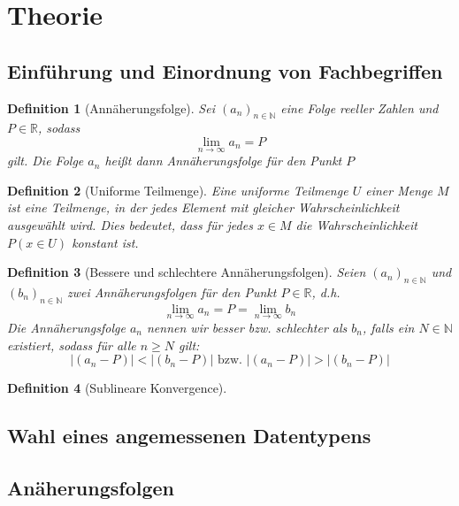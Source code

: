 \documentclass{scrartcl}
\newtheorem{definition}{Definition}
\newtheorem{approximation sequence}{Annäherungsfolge}
\begin{document}
\section{Theorie}

\subsection{Einführung und Einordnung von Fachbegriffen}

\begin{definition}[Annäherungsfolge]
  Sei \((a_n)_{n \in \mathbb{N}}\) eine Folge reeller Zahlen und \(P \in \mathbb{R}\), sodass
  \[\lim_{n \to \infty} a_n = P \] gilt.
  Die Folge \(a_n\) heißt dann Annäherungsfolge für den Punkt \(P\)

\end{definition}

\begin{definition}[Uniforme Teilmenge]
    Eine uniforme Teilmenge \(U\) einer Menge \(M\) ist eine Teilmenge, in der
    jedes Element mit gleicher Wahrscheinlichkeit ausgewählt wird.
    Dies bedeutet, dass für jedes \(x \in M\) die Wahrscheinlichkeit \(P(x \in U)\)
    konstant ist.
\end{definition}

\begin{definition}[Bessere und schlechtere Annäherungsfolgen]
  Seien \((a_n)_{n \in \mathbb{N}}\) und \((b_n)_{n \in \mathbb{N}}\) zwei Annäherungsfolgen für den Punkt \(P \in \mathbb{R}\), d.h.
  \[\lim_{n \to \infty} a_n = P = \lim_{n \to \infty} b_n \] Die Annäherungsfolge \(a_n\) nennen wir besser bzw. schlechter als \(b_n\), falls ein
  \(N \in \mathbb{N}\) existiert, sodass für alle \(n \geq N\) gilt:
  \[ |(a_n - P)| < |(b_n - P)| \text{ bzw. } |(a_n - P)| > |(b_n - P)|\]
\end{definition}

\begin{definition}[Sublineare Konvergence]
\end{definition}

\subsection{Wahl eines angemessenen Datentypens}

\subsection{Anäherungsfolgen}
\end{document}
